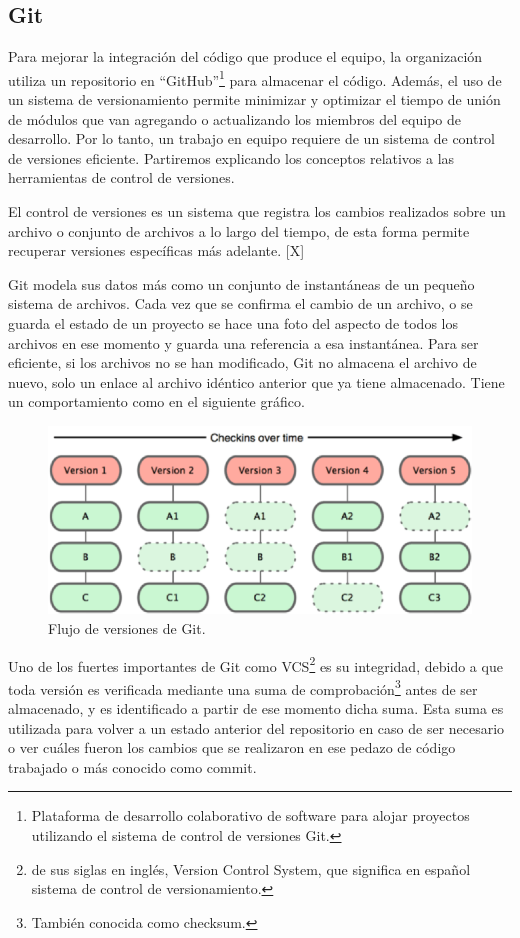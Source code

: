 \subsection{Git}
Para mejorar la integración del código que produce el equipo, la organización utiliza un repositorio en \enquote{GitHub}\footnote{Plataforma de desarrollo colaborativo de software para alojar proyectos utilizando el sistema de control de versiones Git.} para almacenar el código. Además, el uso de un sistema de versionamiento permite minimizar y optimizar el tiempo de unión de módulos que van agregando o actualizando los miembros del equipo de desarrollo. Por lo tanto, un trabajo en equipo requiere de un sistema de control de versiones eficiente. Partiremos explicando los conceptos relativos a las herramientas de control de versiones.

El control de versiones es un sistema que registra los cambios realizados sobre un archivo o conjunto de archivos a lo largo del tiempo, de esta forma permite recuperar versiones específicas más adelante. [X]

Git modela sus datos más como un conjunto de instantáneas de un pequeño sistema de archivos. Cada vez que se confirma el cambio de un archivo, o se guarda el estado de un proyecto se hace una foto del aspecto de todos los archivos en ese momento y guarda una referencia a esa instantánea. Para ser eficiente, si los archivos no se han modificado, Git no almacena el archivo de nuevo, solo un enlace al archivo idéntico anterior que ya tiene almacenado. Tiene un comportamiento como en el siguiente gráfico. 

\begin{figure}[H]
\centering
\includegraphics[width=125mm,scale=1]{Figuras/tecnologias/git_over_time}
\caption{Flujo de versiones de Git.}
  \label{graph_git}
\end{figure}

Uno de los fuertes importantes de Git como VCS\footnote{de sus siglas en inglés, Version Control System, que significa en español sistema de control de versionamiento.} es su integridad, debido a que toda versión es verificada mediante una suma de comprobación\footnote{También conocida como checksum.} antes de ser almacenado, y es identificado a partir de ese momento dicha suma. Esta suma es utilizada para volver a un estado anterior del repositorio en caso de ser necesario o ver cuáles fueron los cambios que se realizaron en ese pedazo de código trabajado o más conocido como commit.

